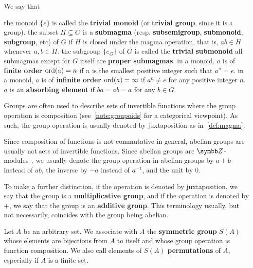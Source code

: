 \begin{definition}
  We say that
  \begin{defenum}
     the monoid \( \{ e \} \) is called the \textbf{trivial monoid} (or \textbf{trivial group}, since it is a group).
     the subset \( H \subseteq G \) is a \textbf{submagma} (resp. \textbf{subsemigroup}, \textbf{submonoid}, \textbf{subgroup}, etc) of \( G \) if \( H \) is closed under the magma operation, that is, \( ab \in H \) whenever \( a, b \in H \).
     the subgroup \( \{ e_G \} \) of \( G \) is called the \textbf{trivial submonoid}
     all submagmas except for \( G \) itself are \textbf{proper submagmas}.
     in a monoid, \( a \) is of \textbf{finite order} \( \operatorname{ord}(a) = n \) if \( n \) is the smallest positive integer such that \( a^n = e \).
     in a monoid, \( a \) is of \textbf{infinite order} \( \operatorname{ord}(a) = \infty \) if \( a^n \neq e \) for any positive integer \( n \).
     \( a \) is an \textbf{absorbing element} if \( ba = ab = a \) for any \( b \in G \).
  \end{defenum}
\end{definition}

\begin{note}\label{note:additive_group}
  Groups are often used to describe sets of invertible functions where the group operation is composition (see~\cref{note:groupoids} for a categorical viewpoint). As such, the group operation is usually denoted by juxtaposition as in~\cref{def:magma}.

  Since composition of functions is not commutative in general, abelian groups are usually not sets of invertible functions. Since abelian groups are \( \BB{Z} \)-modules~, we usually denote the group operation in abelian groups by \( a + b \) instead of \( ab \), the inverse by \( -a \) instead of \( a^{-1} \), and the unit by \( 0 \).

  To make a further distinction, if the operation is denoted by juxtaposition, we say that the group is a \textbf{multiplicative group}, and if the operation is denoted by \( + \), we say that the group is an \textbf{additive group}. This terminology usually, but not necessarily, coincides with the group being abelian.
\end{note}

\begin{definition}\label{def:symmetric_group}
  Let \( A \) be an arbitrary set. We associate with \( A \) the \textbf{symmetric group} \( S(A) \) whose elements are bijections from \( A \) to itself and whose group operation is function composition. We also call elements of \( S(A) \) \textbf{permutations} of \( A \), especially if \( A \) is a finite set.
\end{definition}

